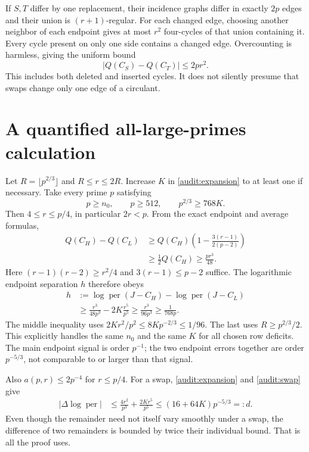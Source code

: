 \documentclass[11pt,a4paper]{article}
\newcommand{\per}{\operatorname{per}}
\begin{document}
If $S,T$ differ by one replacement, their incidence graphs differ in exactly $2p$ edges and their union is $(r+1)$-regular. For each changed edge, choosing another neighbor of each endpoint gives at most $r^2$ four-cycles of that union containing it. Every cycle present on only one side contains a changed edge. Overcounting is harmless, giving the uniform bound
\begin{equation}\label{audit:swap}
 |Q(C_S)-Q(C_T)|\le2pr^2.
\end{equation}
This includes both deleted and inserted cycles. It does not silently presume that swaps change only one edge of a circulant.

\section{A quantified all-large-primes calculation}
Let $R=\lfloor p^{2/3}\rfloor$ and $R\le r\le2R$. Increase $K$ in \eqref{audit:expansion} to at least one if necessary. Take every prime $p$ satisfying
\begin{equation}\label{audit:threshold}
 p\ge n_0,\qquad p\ge512,\qquad p^{2/3}\ge768K.
\end{equation}
Then $4\le r\le p/4$, in particular $2r<p$. From the exact endpoint and average formulas,
\begin{align*}
 Q(C_H)-Q(C_L)
 &\ge Q(C_H)\left(1-\frac{3(r-1)}{2(p-2)}\right)\\
 &\ge\frac12Q(C_H)\ge\frac{pr^3}{48}.
\end{align*}
Here $(r-1)(r-2)\ge r^2/4$ and $3(r-1)\le p-2$ suffice. The logarithmic endpoint separation $h$ therefore obeys
\begin{align}
 h&:=\log\per(J-C_H)-\log\per(J-C_L)\nonumber\\
 &\ge\frac{r^3}{48p^3}-2K\frac{r^5}{p^5}
 \ge\frac{r^3}{96p^3}\ge\frac1{768p}.\label{audit:gap}
\end{align}
The middle inequality uses $2Kr^2/p^2\le8Kp^{-2/3}\le1/96$. The last uses $R\ge p^{2/3}/2$. This explicitly handles the same $n_0$ and the same $K$ for all chosen row deficits. The main endpoint signal is order $p^{-1}$; the two endpoint errors together are order $p^{-5/3}$, not comparable to or larger than that signal.

Also $a(p,r)\le2p^{-4}$ for $r\le p/4$. For a swap, \eqref{audit:expansion} and \eqref{audit:swap} give
\begin{align}
 |\Delta\log\per|
 &\le\frac{4r^2}{p^3}+\frac{2Kr^5}{p^5}
 \le (16+64K)p^{-5/3}=:d.\label{audit:steps}
\end{align}
Even though the remainder need not itself vary smoothly under a swap, the difference of two remainders is bounded by twice their individual bound. That is all the proof uses.
\end{document}
